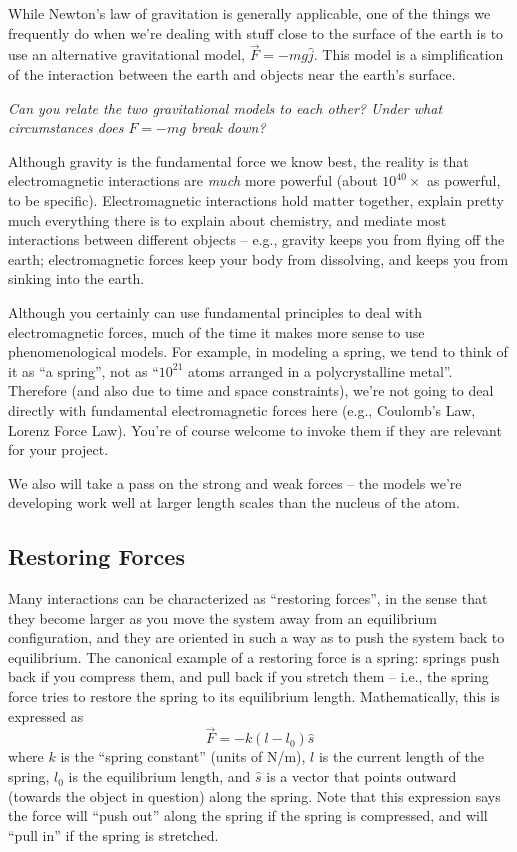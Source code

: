 \documentclass{tufte-handout}
\begin{document}
While Newton's law of gravitation is generally applicable, one of the things we frequently do when we're dealing with stuff close to the surface of the earth is to use an alternative gravitational model, 
 $\vec{F} = -mg\hat{j}$.  This model is a simplification of the interaction between the earth and objects near the earth's surface.
 

{\it Can you relate the two gravitational models to each other?  Under what circumstances does $F=-mg$ break down?}

Although gravity is the fundamental force we know best, the reality is that electromagnetic interactions are {\it much} more powerful (about $10^{40} \times$ as powerful, to be specific).  Electromagnetic interactions hold matter together, explain pretty much everything there is to explain about chemistry, and mediate most interactions between different objects -- e.g., gravity keeps you from flying off the earth; electromagnetic forces keep your body from dissolving, and keeps you from sinking into the earth.
 
Although you certainly can use fundamental principles to deal with electromagnetic forces, much of the time it makes more sense to use phenomenological models.  For example, in modeling a spring, we tend to think of it as ``a spring'', not as ``$10^{21}$ atoms arranged in a polycrystalline metal''.  Therefore (and also  due to time and space constraints), we're not going to deal directly with fundamental electromagnetic forces here (e.g., Coulomb's Law, Lorenz Force Law).   You're of course welcome to invoke them if they are relevant for your project.

We also will take a pass on the strong and weak forces -- the models we're developing work well at larger length scales than the nucleus of the atom.
 
 \subsection{Restoring Forces}
Many interactions can be characterized as ``restoring forces'', in the sense that they become larger as you move the system away from an equilibrium configuration, and they are oriented in such a way as to push the system back to equilibrium.  The canonical example of a restoring force is a spring:  springs push back if you compress them, and pull back if you stretch them  -- i.e., the spring force tries to restore the spring to its equilibrium length.  Mathematically, this is expressed as 
$$\vec{F} = - k(l-l_0) \hat{s}$$
where $k$ is the ``spring constant'' (units of N/m), $l$ is the current length of the spring, $l_0$ is the equilibrium length, and $\hat{s}$ is a vector that points outward (towards the object in question) along the spring. Note that this expression says the force will ``push out'' along the spring if the spring is compressed, and will ``pull in'' if the spring is stretched.  
\end{document}
